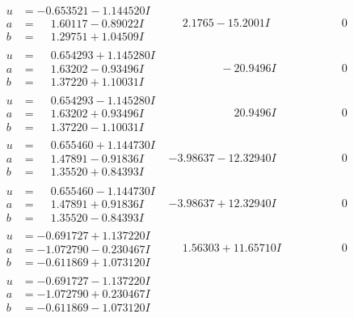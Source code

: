\documentclass[1p]{elsarticle_modified}
\theoremstyle{definition}
\begin{document}
$$\begin{array}{c|c|c}
\begin{aligned}
u &= -0.653521 - 1.144520 I \\
a &= \phantom{-}1.60117 - 0.89022 I \\
b &= \phantom{-}1.29751 + 1.04509 I\end{aligned}
 & \phantom{-}2.1765 - 15.2001 I & \phantom{-0.000000 } 0 \\ \hline\begin{aligned}
u &= \phantom{-}0.654293 + 1.145280 I \\
a &= \phantom{-}1.63202 - 0.93496 I \\
b &= \phantom{-}1.37220 + 1.10031 I\end{aligned}
 & \phantom{-0.000000 } -20.9496 I & \phantom{-0.000000 } 0 \\ \hline\begin{aligned}
u &= \phantom{-}0.654293 - 1.145280 I \\
a &= \phantom{-}1.63202 + 0.93496 I \\
b &= \phantom{-}1.37220 - 1.10031 I\end{aligned}
 & \phantom{-0.000000 -}20.9496 I & \phantom{-0.000000 } 0 \\ \hline\begin{aligned}
u &= \phantom{-}0.655460 + 1.144730 I \\
a &= \phantom{-}1.47891 - 0.91836 I \\
b &= \phantom{-}1.35520 + 0.84393 I\end{aligned}
 & -3.98637 - 12.32940 I & \phantom{-0.000000 } 0 \\ \hline\begin{aligned}
u &= \phantom{-}0.655460 - 1.144730 I \\
a &= \phantom{-}1.47891 + 0.91836 I \\
b &= \phantom{-}1.35520 - 0.84393 I\end{aligned}
 & -3.98637 + 12.32940 I & \phantom{-0.000000 } 0 \\ \hline\begin{aligned}
u &= -0.691727 + 1.137220 I \\
a &= -1.072790 - 0.230467 I \\
b &= -0.611869 + 1.073120 I\end{aligned}
 & \phantom{-}1.56303 + 11.65710 I & \phantom{-0.000000 } 0 \\ \hline\begin{aligned}
u &= -0.691727 - 1.137220 I \\
a &= -1.072790 + 0.230467 I \\
b &= -0.611869 - 1.073120 I\end{aligned}

\end{array}$$
\end{document}
